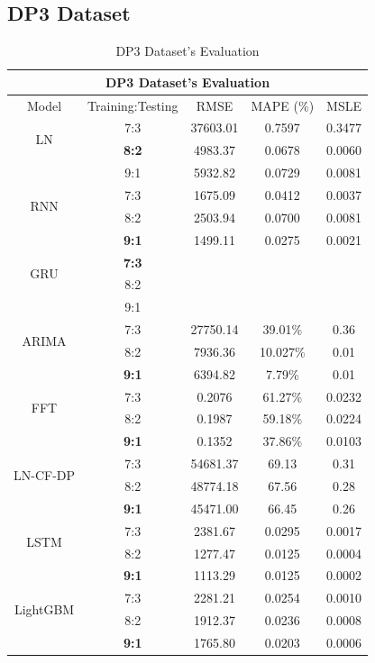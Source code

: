 \documentclass{ieeeojies}
\begin{document}
\subsection{DP3 Dataset}
\begin{table}[H]
    \centering
    \begin{tabular}{|c|c|c|c|c|}
         \hline
         \multicolumn{5}{|c|}{\textbf{DP3 Dataset's Evaluation}}\\
         \hline
         \centering Model & Training:Testing & RMSE & MAPE (\%) & MSLE\\
         \hline
         \multirow{2}{*}{LN}& 7:3 & 37603.01 & 0.7597 & 0.3477\\ & \textbf{8:2} & 4983.37 & 0.0678 & 0.0060\\ & {9:1}& 5932.82& 0.0729 & 0.0081\\
         \hline
         \multirow{2}{*}{RNN} & 7:3&1675.09&0.0412&0.0037\\ & 8:2&2503.94&0.0700&0.0081\\ & \textbf{9:1} & 1499.11&0.0275 &0.0021 \\
         \hline
         \multirow{2}{*}{GRU} & \textbf{7:3}	& & & \\ & 8:2 & & & \\ & 9:1 & & & \\
         \hline
         \multirow{2}{*}{ARIMA} & 7:3 & 27750.14  & 39.01\%  &  0.36 \\ & 8:2 & 7936.36  & 10.027\% & 0.01 \\ & \textbf{9:1} & 6394.82 & 7.79\% & 0.01 \\
         \hline
         \multirow{2}{*}{FFT}& 7:3& 0.2076& 61.27\%&0.0232 \\ & 8:2 & 0.1987& 59.18\%& 0.0224\\ & \textbf{9:1}& 0.1352& 37.86\%& 0.0103\\
         \hline
         \multirow{2}{*}{LN-CF-DP} & 7:3 & 54681.37 & 69.13 & 0.31 \\ & {8:2} & 48774.18 & 67.56 & 0.28 \\ & \textbf{9:1} & 45471.00 &66.45&0.26\\
         \hline
         \multirow{2}{*}{LSTM}& 7:3& 2381.67& 0.0295& 0.0017\\ & 8:2 & 1277.47& 0.0125& 0.0004\\ & \textbf{9:1}& 1113.29& 0.0125& 0.0002\\
         \hline
         \multirow{2}{*}{LightGBM}& 7:3& 2281.21& 0.0254 & 0.0010\\ & 8:2 & 1912.37& 0.0236 & 0.0008\\ & \textbf{9:1}& 1765.80& 0.0203 & 0.0006\\
         \hline
    \end{tabular}
    \caption{DP3 Dataset's Evaluation}
    \label{dp3result}
\end{table}
\end{document}
